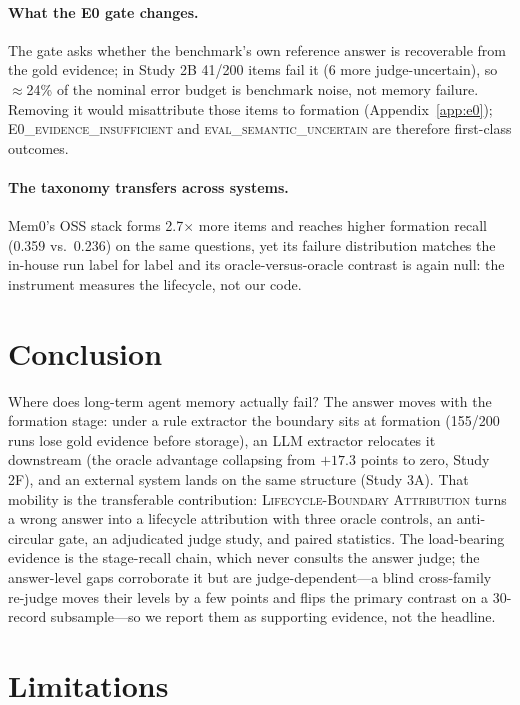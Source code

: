 \documentclass[11pt]{article}
\newcommand{\protocol}{\textsc{Lifecycle-Boundary Attribution}}
\newcommand{\ezero}{E0\textsc{\_evidence\_insufficient}}
\newcommand{\evaluncertain}{\textsc{eval\_semantic\_uncertain}}
\begin{document}
\paragraph{What the E0 gate changes.}
The gate asks whether the benchmark's own reference answer is recoverable
from the gold evidence; in Study 2B 41/200 items fail it (6 more
judge-uncertain), so $\approx$24\% of the nominal error budget is
benchmark noise, not memory failure. Removing it would misattribute
those items to formation (Appendix~\ref{app:e0}); \ezero{} and
\evaluncertain{} are therefore first-class outcomes.

\paragraph{The taxonomy transfers across systems.} Mem0's OSS stack
forms 2.7$\times$ more items and reaches higher formation recall (0.359
vs.\ 0.236) on the same questions, yet its failure distribution matches
the in-house run label for label and its oracle-versus-oracle contrast
is again null: the instrument measures the lifecycle, not our code.

\section{Conclusion}

Where does long-term agent memory actually fail? The answer moves with
the formation stage: under a rule extractor the boundary sits at
formation (155/200 runs lose gold evidence before storage), an LLM
extractor relocates it downstream (the oracle advantage collapsing from
$+17.3$ points to zero, Study 2F), and an external system lands on the
same structure (Study 3A). That mobility is the transferable
contribution: \protocol{} turns a wrong answer into a lifecycle
attribution with three oracle controls, an anti-circular gate, an
adjudicated judge study, and paired statistics. The load-bearing
evidence is the stage-recall chain, which never consults the answer
judge; the answer-level gaps corroborate it but are judge-dependent---a
blind cross-family re-judge moves their levels by a few points and flips
the primary contrast on a 30-record subsample---so we report them as
supporting evidence, not the headline.

\section{Limitations}
\label{sec:limitations}
\end{document}
